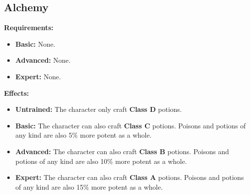 \subsection{Alchemy}
\begin{table}[!ht]
\centering
{}
\end{table}
\textbf{Requirements:}
\begin{itemize}
	\item \textbf{Basic:} None.
	\item \textbf{Advanced:} None.
	\item \textbf{Expert:} None.
\end{itemize}
\textbf{Effects:}
\begin{itemize}
	\item \textbf{Untrained:} The character only craft \textbf{Class D} potions.
	\item \textbf{Basic:} The character can also craft \textbf{Class C} potions. Poisons and potions of any kind are also 5\% more potent as a whole.
	\item \textbf{Advanced:} The character can also craft \textbf{Class B} potions. Poisons and potions of any kind are also 10\% more potent as a whole.
	\item \textbf{Expert:} The character can also craft \textbf{Class A} potions. Poisons and potions of any kind are also 15\% more potent as a whole.
\end{itemize}\newpage
